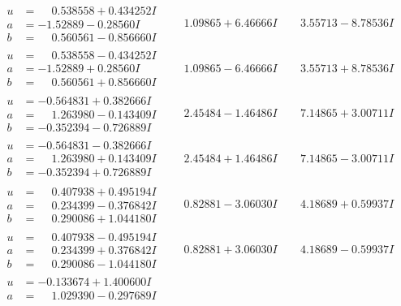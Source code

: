 \documentclass[1p]{elsarticle_modified}
\theoremstyle{definition}
\begin{document}
$$\begin{array}{c|c|c}
\begin{aligned}
u &= \phantom{-}0.538558 + 0.434252 I \\
a &= -1.52889 - 0.28560 I \\
b &= \phantom{-}0.560561 - 0.856660 I\end{aligned}
 & \phantom{-}1.09865 + 6.46666 I & \phantom{-}3.55713 - 8.78536 I \\ \hline\begin{aligned}
u &= \phantom{-}0.538558 - 0.434252 I \\
a &= -1.52889 + 0.28560 I \\
b &= \phantom{-}0.560561 + 0.856660 I\end{aligned}
 & \phantom{-}1.09865 - 6.46666 I & \phantom{-}3.55713 + 8.78536 I \\ \hline\begin{aligned}
u &= -0.564831 + 0.382666 I \\
a &= \phantom{-}1.263980 - 0.143409 I \\
b &= -0.352394 - 0.726889 I\end{aligned}
 & \phantom{-}2.45484 - 1.46486 I & \phantom{-}7.14865 + 3.00711 I \\ \hline\begin{aligned}
u &= -0.564831 - 0.382666 I \\
a &= \phantom{-}1.263980 + 0.143409 I \\
b &= -0.352394 + 0.726889 I\end{aligned}
 & \phantom{-}2.45484 + 1.46486 I & \phantom{-}7.14865 - 3.00711 I \\ \hline\begin{aligned}
u &= \phantom{-}0.407938 + 0.495194 I \\
a &= \phantom{-}0.234399 - 0.376842 I \\
b &= \phantom{-}0.290086 + 1.044180 I\end{aligned}
 & \phantom{-}0.82881 - 3.06030 I & \phantom{-}4.18689 + 0.59937 I \\ \hline\begin{aligned}
u &= \phantom{-}0.407938 - 0.495194 I \\
a &= \phantom{-}0.234399 + 0.376842 I \\
b &= \phantom{-}0.290086 - 1.044180 I\end{aligned}
 & \phantom{-}0.82881 + 3.06030 I & \phantom{-}4.18689 - 0.59937 I \\ \hline\begin{aligned}
u &= -0.133674 + 1.400600 I \\
a &= \phantom{-}1.029390 - 0.297689 I \\

\end{aligned}
\end{array}$$
\end{document}
